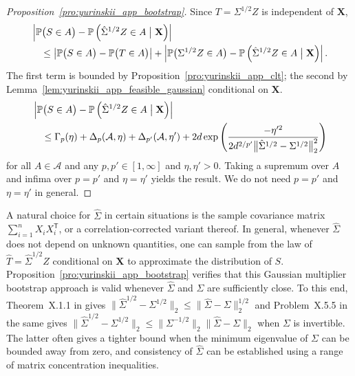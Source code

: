 \documentclass[11pt,lof]{puthesis}
\renewcommand{\P}{\ensuremath{\mathbb{P}}}
\newcommand{\bX}{\ensuremath{\mathbf{X}}}
\newcommand{\cA}{\ensuremath{\mathcal{A}}}
\newcommand{\T}{\ensuremath{\mathsf{T}}}
\theoremstyle{break}
\theoremstyle{proof}
\newtheorem{proof}{Proof}
\begin{document}
\begin{proof}[Proposition~\ref{pro:yurinskii_app_bootstrap}]

  Since $T = \Sigma^{1/2} Z$ is independent of $\bX$,
  \begin{align*}
    &\left|
    \P\big(S \in A\big)
    - \P\left(\hat \Sigma^{1/2} Z \in A \bigm| \bX\right)
    \right| \\
    &\quad\leq
    \left|
    \P\big(S \in A\big)
    - \P\big(T \in A\big)
    \right|
    +\left|
    \P\big(\Sigma^{1/2} Z \in A\big)
    - \P\left(\hat \Sigma^{1/2} Z \in A \bigm| \bX\right)
    \right|.
  \end{align*}
  The first term is bounded by Proposition~\ref{pro:yurinskii_app_clt};
  the second by Lemma~\ref{lem:yurinskii_app_feasible_gaussian}
  conditional on $\bX$.
  \begin{align*}
    &\left|
    \P\big(S \in A\big)
    - \P\left(\hat \Sigma^{1/2} Z \in A \bigm| \bX\right)
    \right| \\
    &\quad\leq
    \Gamma_p(\eta) + \Delta_p(\cA, \eta)
    + \Delta_{p'}(\cA, \eta')
    + 2 d \exp \left( \frac{-\eta'^2}
      {2 d^{2/p'} \big\|\hat\Sigma^{1/2} - \Sigma^{1/2}\big\|_2^2}
    \right)
  \end{align*}
  for all $A \in \cA$
  and any $p, p' \in [1, \infty]$ and $\eta, \eta' > 0$.
  Taking a supremum over $A$ and infima over
  $p = p'$ and $\eta = \eta'$ yields the result.
  We do not need
  $p = p'$ and $\eta = \eta'$ in general.
\end{proof}

A natural choice for $\hat\Sigma$ in certain situations is the sample
covariance matrix $\sum_{i=1}^n X_i X_i^\T$, or a correlation-corrected variant
thereof. In general, whenever $\hat \Sigma$ does not depend on unknown
quantities, one can sample from the law of $\hat T = \hat\Sigma^{1/2} Z$
conditional on $\bX$ to approximate the distribution of $S$.
Proposition~\ref{pro:yurinskii_app_bootstrap} verifies that this Gaussian
multiplier
bootstrap approach is valid whenever $\hat\Sigma$ and $\Sigma$ are sufficiently
close. To this end, Theorem~X.1.1 in \citet{bhatia1997matrix} gives
$\big\|\hat\Sigma^{1/2} - \Sigma^{1/2}\big\|_2
\leq \big\|\hat\Sigma - \Sigma\big\|_2^{1/2}$
and Problem~X.5.5 in the same gives
$\big\|\hat\Sigma^{1/2} - \Sigma^{1/2}\big\|_2
\leq \big\|\Sigma^{-1/2}\big\|_2 \big\|\hat\Sigma - \Sigma\big\|_2$
when $\Sigma$ is invertible. The latter often gives a tighter bound when the
minimum eigenvalue of $\Sigma$ can be bounded away from zero, and consistency
of $\hat \Sigma$ can be established using a range of matrix concentration
inequalities.
\end{document}
